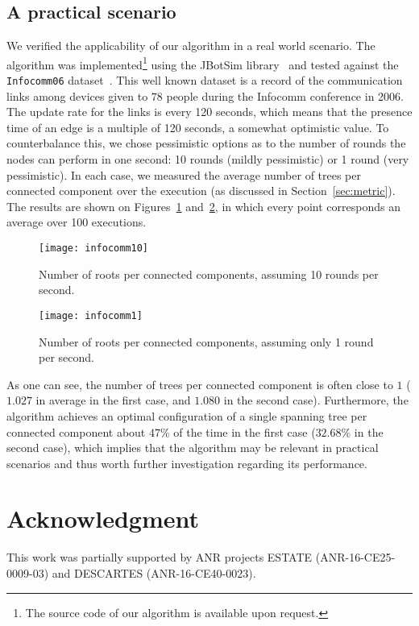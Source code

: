 \documentclass[twocolumn]{article}
\begin{document}
\subsection{A practical scenario}
We verified the applicability of our algorithm in a real world
scenario. The algorithm was implemented\footnote{The source code of our algorithm is available upon request.} using the JBotSim library~\cite{C13} and 
tested against the {\tt Infocomm06} dataset~\cite{infocom06}. This well known dataset is a record of the communication links among devices given to
 $78$ people during the {\sc Infocomm} conference in 2006.
The update rate for the links is every 120 seconds, which means that
the presence time of an edge is a multiple of 120 seconds, a somewhat
optimistic value. 
To counterbalance this, we chose pessimistic options as to the number of 
rounds the nodes can perform in one second: 10 rounds (mildly pessimistic) or 1 round (very pessimistic).
In each case, we measured the average number of trees per connected
component over the execution (as discussed in Section~\ref{sec:metric}). The results are shown on Figures~\ref{fig:infocomm10} and~\ref{fig:infocomm1}, in which every point corresponds an average over 100 executions. 
\begin{figure}[h]
\center
\texttt{[image: infocomm10]}
\caption{Number of roots per connected components, assuming 10 rounds per second.}
\label{fig:infocomm10}
\end{figure}
\begin{figure}[h]
\center
\texttt{[image: infocomm1]}
\caption{Number of roots per connected components, assuming only 1 round per second.}
\label{fig:infocomm1}
\end{figure}

As one can see, the number of trees per connected component is often close to $1$ ($1.027$ in average in the first case, and $1.080$ in the second case). Furthermore, the algorithm achieves an optimal configuration of a single spanning tree per connected component  about $47\%$ of the time in the first case ($32.68\%$ in the second case), which implies that the algorithm may be relevant in practical scenarios and thus worth further investigation regarding its performance.
 




















\section*{Acknowledgment}
{\small This work was partially supported by ANR projects ESTATE (ANR-16-CE25-0009-03) and DESCARTES (ANR-16-CE40-0023).
}



\end{document}
